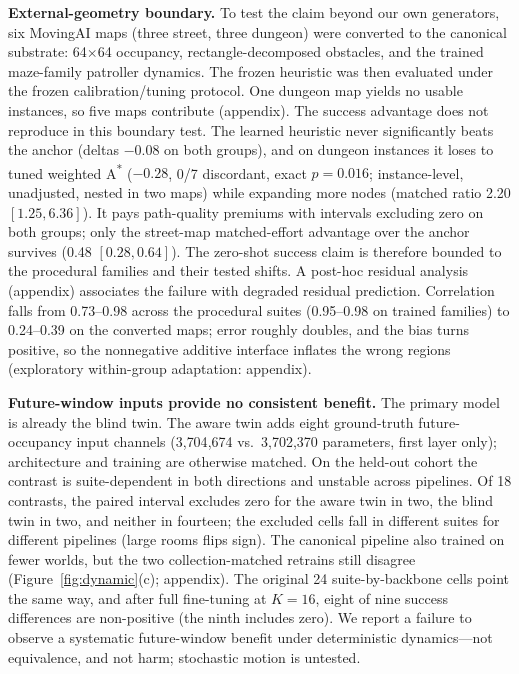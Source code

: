 \documentclass[letterpaper]{article} %
\begin{document}
\textbf{External-geometry boundary.} To test the claim beyond our own generators, six MovingAI maps \citep{sturtevant2012movingai} (three street, three dungeon) were converted to the canonical substrate: 64$\times$64 occupancy, rectangle-decomposed obstacles, and the trained maze-family patroller dynamics. The frozen heuristic was then evaluated under the frozen calibration/tuning protocol. One dungeon map yields no usable instances, so five maps contribute (appendix). The success advantage does not reproduce in this boundary test. The learned heuristic never significantly beats the anchor (deltas $-0.08$ on both groups), and on dungeon instances it loses to tuned weighted A\textsuperscript{*} ($-0.28$, 0/7 discordant, exact $p{=}0.016$; instance-level, unadjusted, nested in two maps) while expanding more nodes (matched ratio 2.20 $[1.25, 6.36]$). It pays path-quality premiums with intervals excluding zero on both groups; only the street-map matched-effort advantage over the anchor survives (0.48 $[0.28, 0.64]$). The zero-shot success claim is therefore bounded to the procedural families and their tested shifts. A post-hoc residual analysis (appendix) associates the failure with degraded residual prediction. Correlation falls from 0.73--0.98 across the procedural suites (0.95--0.98 on trained families) to 0.24--0.39 on the converted maps; error roughly doubles, and the bias turns positive, so the nonnegative additive interface inflates the wrong regions (exploratory within-group adaptation: appendix).

\textbf{Future-window inputs provide no consistent benefit.} The primary model is already the blind twin. The aware twin adds eight ground-truth future-occupancy input channels (3{,}704{,}674 vs.\ 3{,}702{,}370 parameters, first layer only); architecture and training are otherwise matched. On the held-out cohort the contrast is suite-dependent in both directions and unstable across pipelines. Of 18 contrasts, the paired interval excludes zero for the aware twin in two, the blind twin in two, and neither in fourteen; the excluded cells fall in different suites for different pipelines (large rooms flips sign). The canonical pipeline also trained on fewer worlds, but the two collection-matched retrains still disagree (Figure~\ref{fig:dynamic}(c); appendix). The original 24 suite-by-backbone cells point the same way, and after full fine-tuning at $K{=}16$, eight of nine success differences are non-positive (the ninth includes zero). We report a failure to observe a systematic future-window benefit under deterministic dynamics---not equivalence, and not harm; stochastic motion is untested.
\end{document}
